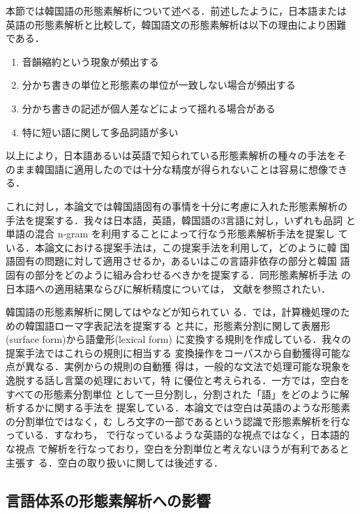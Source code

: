 本節では韓国語の形態素解析について述べる．前述したように，日本語または
英語の形態素解析と比較して，韓国語文の形態素解析は以下の理由により困難
である．

\begin{enumerate}
\item 音韻縮約という現象が頻出する
\item 分かち書きの単位と形態素の単位が一致しない場合が頻出する
\item 分かち書きの記述が個人差などによって揺れる場合がある
\item 特に短い語に関して多品詞語が多い
\end{enumerate}

以上により，日本語あるいは英語で知られている形態素解析の種々の手法をそ
のまま韓国語に適用したのでは十分な精度が得られないことは容易に想像でき
る．

これに対し，本論文では韓国語固有の事情を十分に考慮に入れた形態素解析の
手法を提案する．我々は日本語，英語，韓国語の3言語に対し，いずれも品詞
と単語の混合 n-gram を利用することによって行なう形態素解析手法を提案し
ている．本論文における提案手法は，この提案手法を利用して，どのように韓
国語固有の問題に対して適用させるか，あるいはこの言語非依存の部分と韓国
語固有の部分をどのように組み合わせるべきかを提案する．同形態素解析手法
の日本語への適用結果ならびに解析精度については，
文献\cite{IPSJ:混合bigram}を参照されたい．

韓国語の形態素解析に関しては\cite{DBkim}や\cite{Kwon}などが知られてい
る．\cite{DBkim}では，計算機処理のための韓国語ローマ字表記法を提案する
と共に，形態素分割に関して表層形(surface form)から語彙形(lexical form)
に変換する規則を作成している．我々の提案手法ではこれらの規則に相当する
変換操作をコーパスから自動獲得可能な点が異なる．実例からの規則の自動獲
得は，一般的な文法で処理可能な現象を逸脱する話し言葉の処理において，特
に優位と考えられる．一方\cite{Kwon}では，空白をすべての形態素分割単位
として一旦分割し，分割された「語」をどのように解析するかに関する手法を
提案している．本論文では空白は英語のような形態素の分割単位ではなく，む
しろ文字の一部であるという認識で形態素解析を行なっている．すなわち，
{}\cite{Kwon}で行なっているような英語的な視点ではなく，日本語的な視点
で解析を行なっており，空白を分割単位と考えないほうが有利であると主張す
る．空白の取り扱いに関しては後述する．




\subsection{言語体系の形態素解析への影響}

